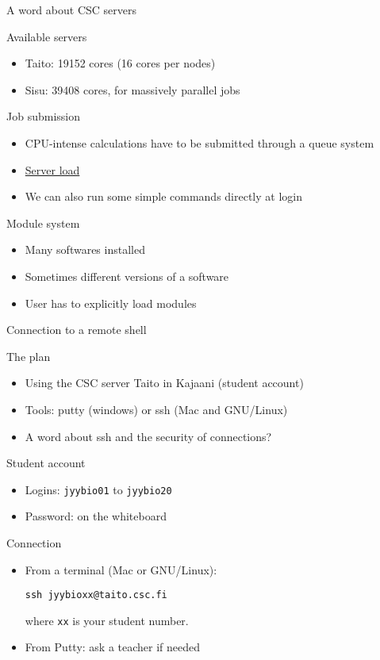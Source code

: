 \documentclass[big]{beamer}
\begin{document}
\begin{frame}[label=sec-2-6]{A word about CSC servers}
\begin{block}{Available servers}
\begin{itemize}
\item Taito: 19152 cores (16 cores per nodes)
\item Sisu: 39408 cores, for massively parallel jobs
\end{itemize}
\end{block}
\begin{block}{Job submission}
\begin{itemize}
\item CPU-intense calculations have to be submitted through a queue system
\item \href{https://sui.csc.fi/group/sui/host-monitor}{Server load}
\item We can also run some simple commands directly at login
\end{itemize}
\end{block}
\begin{block}{Module system}
\begin{itemize}
\item Many softwares installed
\item Sometimes different versions of a software
\item User has to explicitly load \alert{modules}
\end{itemize}
\end{block}
\end{frame}
\begin{frame}[fragile,label=sec-2-7]{Connection to a remote shell}
 \begin{block}{The plan}
\begin{itemize}
\item Using the CSC server Taito in Kajaani (student account)
\item Tools: \alert{putty} (windows) or \alert{ssh} (Mac and GNU/Linux)
\item A word about \alert{ssh} and the \alert{security of connections}?
\end{itemize}
\end{block}
\begin{block}{Student account}
\begin{itemize}
\item Logins: \texttt{jyybio01} to \texttt{jyybio20}
\item Password: on the whiteboard
\end{itemize}
\end{block}
\begin{block}{Connection}
\begin{itemize}
\item From a terminal (Mac or GNU/Linux):
\begin{verbatim}
ssh jyybioxx@taito.csc.fi
\end{verbatim}
where \texttt{xx} is your student number.
\item From Putty: ask a teacher if needed
\end{itemize}
\end{block}
\end{frame}
\end{document}
